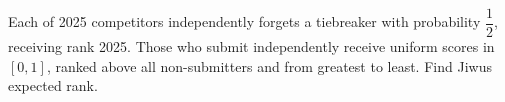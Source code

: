 Each of 2025 competitors independently forgets a tiebreaker with probability $\dfrac{1}{2}$, receiving rank 2025. Those who submit independently receive uniform scores in $[0,1]$, ranked above all non-submitters and from greatest to least. Find Jiwu\textquotesingle s expected rank.
